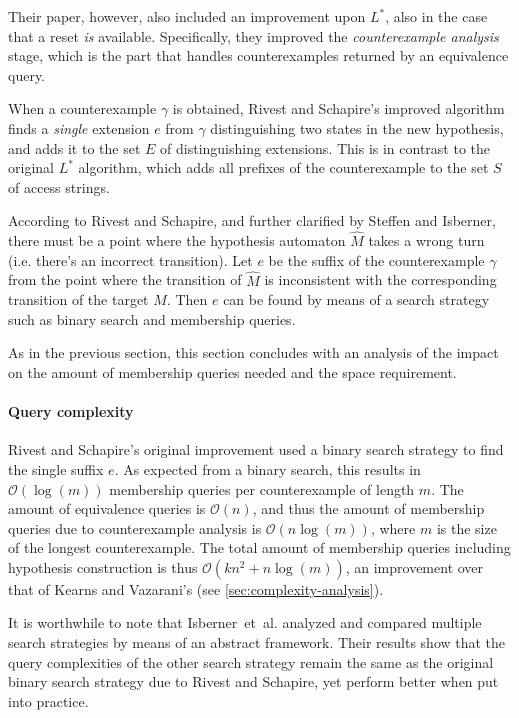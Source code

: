\documentclass[multi,crop=false,class=article]{standalone}
\begin{document}
Their paper, however, also included an improvement upon $L^*$, also in the case
that a reset \textit{is} available. Specifically, they improved the
\textit{counterexample analysis} stage, which is the part that handles
counterexamples returned by an equivalence query.

When a counterexample $\gamma$ is obtained, Rivest and Schapire's improved
algorithm finds a \textit{single} extension $e$ from $\gamma$ distinguishing two
states in the new hypothesis, and adds it to the set $E$ of distinguishing
extensions. This is in contrast to the original $L^*$ algorithm, which adds
all prefixes of the counterexample to the set $S$ of access strings.

According to Rivest and Schapire\cite{Rivest1993}, and further clarified by
Steffen\cite{Steffen2011} and Isberner\cite{Isberner2014a}, there must be a point
where the hypothesis automaton $\hat M$ takes a wrong turn (i.e. there's an
incorrect transition). Let $e$ be the suffix of the counterexample $\gamma$ from
the point where the transition of $\hat M$ is inconsistent with the
corresponding transition of the target $M$. Then $e$ can be found by means of a
search strategy such as binary search and membership queries.

As in the previous section, this section concludes with an analysis of the
impact on the amount of membership queries needed and the space requirement.

\paragraph{Query complexity} Rivest and Schapire's original improvement used a
binary search strategy to find the single suffix $e$. As expected from a binary
search, this results in $\mathcal{O}(\log(m))$ membership queries per
counterexample of length $m$. The amount of equivalence queries is
$\mathcal{O}(n)$, and thus the amount of membership queries due to
counterexample analysis is $\mathcal{O}(n\log(m))$, where $m$ is the size of the
longest counterexample. The total amount of membership queries including
hypothesis construction is thus $\mathcal{O}(kn^2 + n\log(m))$, an improvement
over that of Kearns and Vazarani's (see \cref{sec:complexity-analysis}).

It is worthwhile to note that Isberner~et~al. analyzed and compared multiple
search strategies by means of an abstract framework\cite{Isberner2014a}. Their
results show that the query complexities of the other search strategy remain the
same as the original binary search strategy due to Rivest and Schapire, yet
perform better when put into practice.
\end{document}
